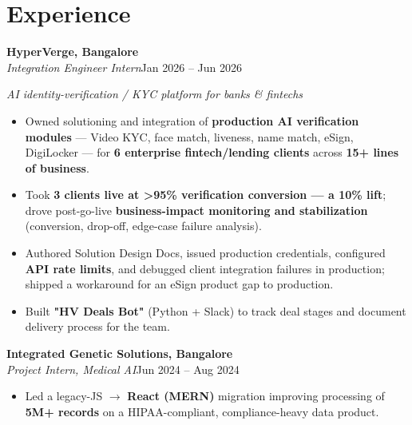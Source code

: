 \documentclass[10pt,a4paper]{article}
\begin{document}
\section*{Experience}
\vspace{1pt}\textbf{HyperVerge, Bangalore}\\
\textit{Integration Engineer Intern}\hfill Jan 2026 -- Jun 2026\par\vspace{1pt}
{\small\itshape AI identity-verification / KYC platform for banks \& fintechs}\par\vspace{1pt}
\begin{itemize}
\item Owned solutioning and integration of \textbf{production AI verification modules} --- Video KYC, face match, liveness, name match, eSign, DigiLocker --- for \textbf{6 enterprise fintech/lending clients} across \textbf{15+ lines of business}.
\item Took \textbf{3 clients live at \textgreater{}95\% verification conversion --- a 10\% lift}; drove post-go-live \textbf{business-impact monitoring and stabilization} (conversion, drop-off, edge-case failure analysis).
\item Authored Solution Design Docs, issued production credentials, configured \textbf{API rate limits}, and debugged client integration failures in production; shipped a workaround for an eSign product gap to production.
\item Built \textbf{"HV Deals Bot"} (Python + Slack) to track deal stages and document delivery process for the team.
\end{itemize}
\vspace{1pt}\textbf{Integrated Genetic Solutions, Bangalore}\\
\textit{Project Intern, Medical AI}\hfill Jun 2024 -- Aug 2024\par\vspace{1pt}
\begin{itemize}
\item Led a legacy-JS $\rightarrow$ \textbf{React (MERN)} migration improving processing of \textbf{5M+ records} on a HIPAA-compliant, compliance-heavy data product.
\end{itemize}
\end{document}
